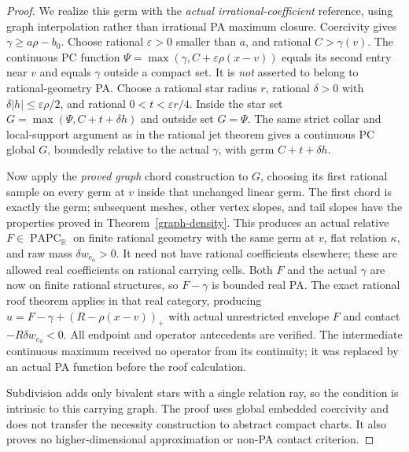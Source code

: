 \documentclass[11pt]{article}
\newcommand{\R}{\mathbb R}
\newcommand{\PAPC}{\operatorname{PAPC}}
\begin{document}
\begin{proof}
We realize this germ with the \emph{actual irrational-coefficient}
reference, using graph interpolation rather than irrational PA maximum
closure. Coercivity gives $\gamma\geq a\rho-b_0$. Choose rational
$\varepsilon>0$ smaller than $a$, and rational $C>\gamma(v)$.
The continuous PC function
$\Psi=\max(\gamma,C+\varepsilon\rho(x-v))$ equals its second entry
near $v$ and equals $\gamma$ outside a compact set. It is \emph{not}
asserted to belong to rational-geometry PA. Choose a rational star
radius $r$, rational $\delta>0$ with $\delta|h|\leq\varepsilon\rho/2$,
and rational $0<t<\varepsilon r/4$.
Inside the star set $G=\max(\Psi,C+t+\delta h)$ and outside set $G=\Psi$.
The same strict collar and local-support argument as in the rational
jet theorem gives a continuous PC global $G$, boundedly relative to
the actual $\gamma$, with germ $C+t+\delta h$.

Now apply the \emph{proved graph} chord construction to $G$, choosing
its first rational sample on every germ at $v$ inside that unchanged
linear germ. The first chord is exactly the germ; subsequent meshes,
other vertex slopes, and tail slopes have the properties proved in
Theorem~\ref{graph-density}. This produces an actual relative
$F\in\PAPC_\R$ on finite rational geometry with the same germ at $v$,
flat relation $\kappa$, and raw mass $\delta w_{e_0}>0$.
It need not have rational coefficients elsewhere; these are allowed
real coefficients on rational carrying cells. Both $F$ and the actual
$\gamma$ are now on finite rational structures, so $F-\gamma$ is
bounded real PA. The exact rational roof theorem applies in that real
category, producing $u=F-\gamma+(R-\rho(x-v))_+$ with actual
unrestricted envelope $F$ and contact $-R\delta w_{e_0}<0$.
All endpoint and operator antecedents are verified. The intermediate
continuous maximum received no operator from its continuity; it was
replaced by an actual PA function before the roof calculation.

Subdivision adds only bivalent stars with a single relation ray, so the
condition is intrinsic to this carrying graph. The proof uses global
embedded coercivity and does not transfer the necessity construction
to abstract compact charts. It also proves no higher-dimensional
approximation or non-PA contact criterion.
\end{proof}
\end{document}
